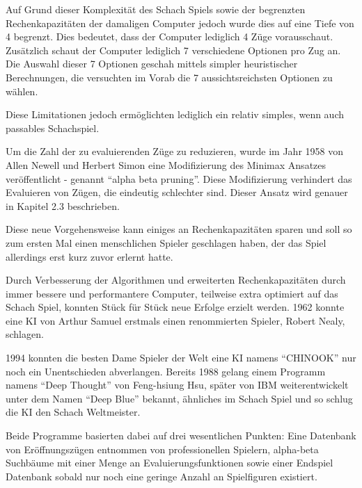 Auf Grund dieser Komplexität des Schach Spiels sowie der begrenzten Rechenkapazitäten der damaligen Computer jedoch wurde dies auf eine Tiefe von 4 begrenzt. Dies bedeutet, dass der Computer lediglich 4 Züge vorausschaut. Zusätzlich schaut der Computer lediglich 7 verschiedene Optionen pro Zug an. Die Auswahl dieser 7 Optionen geschah mittels simpler heuristischer Berechnungen, die versuchten im Vorab die 7 aussichtsreichsten Optionen zu wählen.


Diese Limitationen jedoch ermöglichten lediglich ein relativ simples, wenn auch passables Schachspiel.


Um die Zahl der zu evaluierenden Züge zu reduzieren, wurde im Jahr 1958 von Allen Newell und Herbert Simon eine Modifizierung des Minimax Ansatzes veröffentlicht - genannt ``alpha beta pruning''. Diese Modifizierung verhindert das Evaluieren von Zügen, die eindeutig schlechter sind. Dieser Ansatz wird genauer in Kapitel 2.3 beschrieben.


Diese neue Vorgehensweise kann einiges an Rechenkapazitäten sparen und soll so zum ersten Mal einen menschlichen Spieler geschlagen haben, der das Spiel allerdings erst kurz zuvor erlernt hatte.

Durch Verbesserung der Algorithmen und erweiterten Rechenkapazitäten durch immer bessere und performantere Computer, teilweise extra optimiert auf das Schach Spiel, konnten Stück für Stück neue Erfolge erzielt werden. 1962 konnte eine KI von Arthur Samuel erstmals einen renommierten Spieler, Robert Nealy, schlagen.

1994 konnten die besten Dame Spieler der Welt eine KI namens ``CHINOOK'' nur noch ein Unentschieden abverlangen. Bereits 1988 gelang einem Programm namens ``Deep Thought'' von Feng-hsiung Hsu, später von IBM weiterentwickelt unter dem Namen ``Deep Blue'' bekannt, ähnliches im Schach Spiel und so schlug die KI den Schach Weltmeister.

Beide Programme basierten dabei auf drei wesentlichen Punkten: Eine Datenbank von Eröffnungszügen entnommen von professionellen Spielern, alpha-beta Suchbäume mit einer Menge an Evaluierungsfunktionen sowie einer Endspiel Datenbank sobald nur noch eine geringe Anzahl an Spielfiguren existiert.

